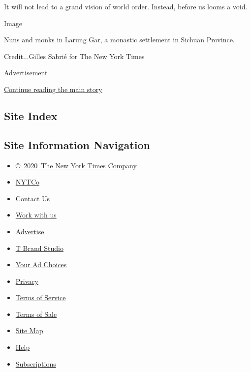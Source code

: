 It will not lead to a grand vision of world order. Instead, before us
looms a void.

Image

Nuns and monks in Larung Gar, a monastic settlement in Sichuan Province.

Credit...Gilles Sabrié for The New York Times

Advertisement

\protect\hyperlink{after-bottom}{Continue reading the main story}

\hypertarget{site-index}{%
\subsection{Site Index}\label{site-index}}

\hypertarget{site-information-navigation}{%
\subsection{Site Information
Navigation}\label{site-information-navigation}}

\begin{itemize}
\tightlist
\item
  \href{https://help.nytimes3xbfgragh.onion/hc/en-us/articles/115014792127-Copyright-notice}{©~2020~The
  New York Times Company}
\end{itemize}

\begin{itemize}
\tightlist
\item
  \href{https://www.nytco.com/}{NYTCo}
\item
  \href{https://help.nytimes3xbfgragh.onion/hc/en-us/articles/115015385887-Contact-Us}{Contact
  Us}
\item
  \href{https://www.nytco.com/careers/}{Work with us}
\item
  \href{https://nytmediakit.com/}{Advertise}
\item
  \href{http://www.tbrandstudio.com/}{T Brand Studio}
\item
  \href{https://www.nytimes3xbfgragh.onion/privacy/cookie-policy\#how-do-i-manage-trackers}{Your
  Ad Choices}
\item
  \href{https://www.nytimes3xbfgragh.onion/privacy}{Privacy}
\item
  \href{https://help.nytimes3xbfgragh.onion/hc/en-us/articles/115014893428-Terms-of-service}{Terms
  of Service}
\item
  \href{https://help.nytimes3xbfgragh.onion/hc/en-us/articles/115014893968-Terms-of-sale}{Terms
  of Sale}
\item
  \href{https://spiderbites.nytimes3xbfgragh.onion}{Site Map}
\item
  \href{https://help.nytimes3xbfgragh.onion/hc/en-us}{Help}
\item
  \href{https://www.nytimes3xbfgragh.onion/subscription?campaignId=37WXW}{Subscriptions}
\end{itemize}

